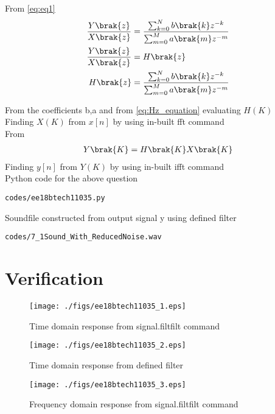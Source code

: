 \documentclass[journal,12pt,twocolumn]{IEEEtran}
\begin{document}
From \eqref{eq:eq1}
\begin{align}
\label{eq:Hz_equation}
   \frac{Y\brak{z}}{X\brak{z}} &= \frac{\sum _{k=0}^{N}b\brak{k} z^{-k}}{\sum _{m=0}^{M}a\brak{m}z^{-m}} \\
    \frac{Y\brak{z}}{X\brak{z}} &= H\brak{z} \\
    H\brak{z} &= \frac{\sum _{k=0}^{N}b\brak{k} z^{-k}}{\sum _{m=0}^{M}a\brak{m}z^{-m}}
\end{align}

From the coefficients b,a and from \eqref{eq:Hz_equation} evaluating $H(K)$
\\
Finding $X(K)$ from $x[n]$ by using in-built fft command\\

From 
\begin{align}
    Y\brak{K} = H\brak{K}X\brak{K}
\end{align}
Finding $y[n]$ from $Y(K)$ by using in-built ifft command
\\
Python code for the above question
\begin{lstlisting}
codes/ee18btech11035.py
\end{lstlisting}

Soundfile constructed from output signal y using defined filter 
\begin{lstlisting}
codes/7_1Sound_With_ReducedNoise.wav
\end{lstlisting}


\section{Verification}
\begin{figure}[!h]
\centering
\texttt{[image: ./figs/ee18btech11035\_1.eps]}
\caption{Time domain response from signal.filtfilt command}
\label{fig:Figure1}
\end{figure}

\begin{figure}[!h]
\centering
\texttt{[image: ./figs/ee18btech11035\_2.eps]}
\caption{Time domain response from defined filter}
\label{fig:Figure2}
\end{figure}

\begin{figure}[!h]
\centering
\texttt{[image: ./figs/ee18btech11035\_3.eps]}
\caption{Frequency domain response from signal.filtfilt command}
\label{fig:Figure3}
\end{figure}
\end{document}
